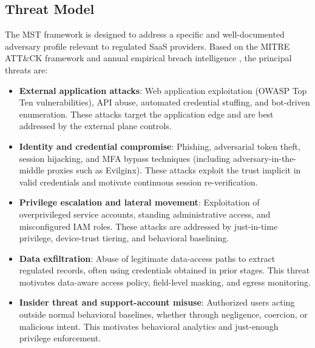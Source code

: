 \documentclass[acmlarge]{acmart}
\begin{document}
\subsection{Threat Model}

The MST framework is designed to address a specific and well-documented adversary profile
relevant to regulated SaaS providers. Based on the MITRE ATT\&CK framework
\cite{strom2018} and annual empirical breach intelligence \cite{verizon2025,crowdstrike2025,ciscotalos2025}, the principal threats are:

\begin{itemize}
\item \textbf{External application attacks}: Web application exploitation (OWASP Top Ten
      vulnerabilities), API abuse, automated credential stuffing, and bot-driven enumeration.
      These attacks target the application edge and are best addressed by the external plane
      controls.

\item \textbf{Identity and credential compromise}: Phishing, adversarial token theft,
      session hijacking, and MFA bypass techniques (including adversary-in-the-middle
      proxies such as Evilginx). These attacks exploit the trust implicit in valid
      credentials and motivate continuous session re-verification.

\item \textbf{Privilege escalation and lateral movement}: Exploitation of overprivileged
      service accounts, standing administrative access, and misconfigured IAM roles.
      These attacks are addressed by just-in-time privilege, device-trust tiering, and
      behavioral baselining.

\item \textbf{Data exfiltration}: Abuse of legitimate data-access paths to extract
      regulated records, often using credentials obtained in prior stages. This threat
      motivates data-aware access policy, field-level masking, and egress monitoring.

\item \textbf{Insider threat and support-account misuse}: Authorized users acting outside
      normal behavioral baselines, whether through negligence, coercion, or malicious intent.
      This motivates behavioral analytics and just-enough privilege enforcement.


\end{itemize}
\end{document}
